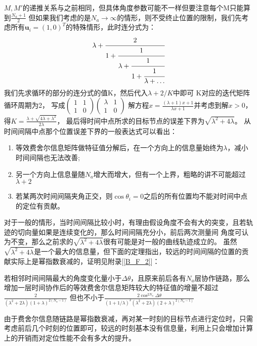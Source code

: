 $M,M'$的递推关系与之前相同，但具体角度参数可能不一样但要注意每个M只能算到$\frac{N_a+1}{2}$
但如果我们考虑的是$N_a\to \infty$的情形，则不受终止位置的限制，我们先考虑所有$\bm{u}_i=(1,0)^T$的特殊情形，此时连分式为：
\begin{equation}\label{eq:gcf_1}
\lambda+\cfrac{2}{1+\cfrac{1}{\lambda+\cfrac{1}{1+\cfrac{1}{\lambda+\dots}}}}
\end{equation}
我们先求循环的部分的连分式的值K，然后代入$\lambda+2/K$中即可
K对应的迭代矩阵循环周期为2，
写成$\begin{pmatrix}1 & 1 \\1 & 0\end{pmatrix}\begin{pmatrix}\lambda & 1 \\1 & 0\end{pmatrix}$
解方程$x=\frac{(\lambda+1)x+1}{\lambda x+1}$并考虑到解$x>0$，得$K=\frac{\lambda+\sqrt{4\lambda+\lambda^2}}{2\lambda}$，
最后得时间中点所求的目标节点的误差下界为$\sqrt{\lambda^2+4\lambda}$。
从时间间隔中点那个位置误差下界的一般表达式可以看出：
\begin{enumerate}
  \item 等效费舍尔信息矩阵做特征值分解后，在一个方向上的信息量始终为$\lambda$，减小时间间隔也无法改善;
  \item 另一个方向上信息量随$N_a$增大而增大，但有一个上界，粗略的讲不可能超过$\lambda+2$
  \item 若某两次时间间隔夹角正交，则$\cos\theta_i=0$之后的所有位置均不能对时间中点的定位有贡献。
\end{enumerate}
对于一般的情形，当时间间隔比较小时，有理由假设角度不会有大的突变，且若轨迹的切向量如果是连续变化的，那么时间间隔充分小，前后两次测量间
角度可认为不变，那么之前求的$\sqrt{\lambda^2+4\lambda}$很有可能是对一般的曲线轨迹成立的。
虽然$\sqrt{\lambda^2+4\lambda}$是一个最大的信息量，但下面的定理指出，较远的时间间隔的位置的贡献实际上是幂指数衰减的，证明见附录[\ref{B_F_2}]：
\begin{theorem}
若相邻时间间隔最大的角度变化量小于$\Delta \theta$，且原来前后各有$N_a$层协作链路，那么增加一层时间协作后的等效费舍尔信息矩阵较大的特征值的增量不超过
$\frac{2}{(\lambda^2+2\lambda)(1+\lambda)^{2(N_a-1)}}$
但也不小于$\frac{2\cos^{2N_a}\Delta\theta}{(1+1/\lambda)^2(\lambda^2+2\lambda)(2+\lambda)^{2(N_a-1)}}$
\end{theorem}
\begin{remark}
由于费舍尔信息随链路是幂指数衰减，再对某一时刻的目标节点进行定位时，只需考虑前后几个时刻的位置即可，较远的时刻基本没有信息量，利用上只会增加计算上的开销而对定位性能不会有多大的提升。
\end{remark}

